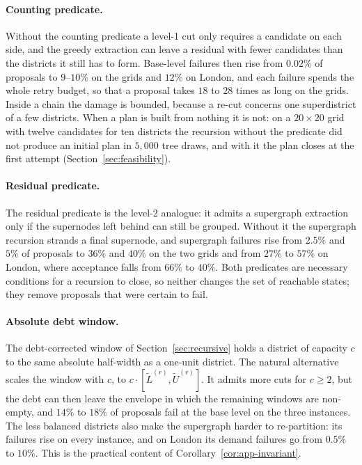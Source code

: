 \documentclass[11pt]{article}
\theoremstyle{definition}
\begin{document}
\paragraph{Counting predicate.}
Without the counting predicate a level-1 cut only requires a candidate on each side, and the greedy extraction can leave a residual with fewer candidates than the districts it still has to form. Base-level failures then rise from $0.02\%$ of proposals to $9$--$10\%$ on the grids and $12\%$ on London, and each failure spends the whole retry budget, so that a proposal takes $18$ to $28$ times as long on the grids. Inside a chain the damage is bounded, because a re-cut concerns one superdistrict of a few districts. When a plan is built from nothing it is not: on a $20\times20$ grid with twelve candidates for ten districts the recursion without the predicate did not produce an initial plan in $5{,}000$ tree draws, and with it the plan closes at the first attempt (Section~\ref{sec:feasibility}).

\paragraph{Residual predicate.}
The residual predicate is the level-2 analogue: it admits a supergraph extraction only if the supernodes left behind can still be grouped. Without it the supergraph recursion strands a final supernode, and supergraph failures rise from $2.5\%$ and $5\%$ of proposals to $36\%$ and $40\%$ on the two grids and from $27\%$ to $57\%$ on London, where acceptance falls from $66\%$ to $40\%$. Both predicates are necessary conditions for a recursion to close, so neither changes the set of reachable states; they remove proposals that were certain to fail.

\paragraph{Absolute debt window.}
The debt-corrected window of Section~\ref{sec:recursive} holds a district of capacity $c$ to the same absolute half-width as a one-unit district. The natural alternative scales the window with $c$, to $c\cdot[\widetilde L^{(r)},\widetilde U^{(r)}]$. It admits more cuts for $c \ge 2$, but the debt can then leave the envelope in which the remaining windows are non-empty, and $14\%$ to $18\%$ of proposals fail at the base level on the three instances. The less balanced districts also make the supergraph harder to re-partition: its failures rise on every instance, and on London its demand failures go from $0.5\%$ to $10\%$. This is the practical content of Corollary~\ref{cor:app-invariant}.
\end{document}
